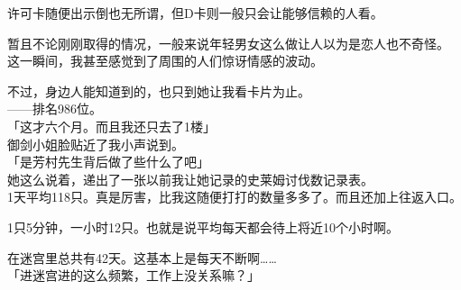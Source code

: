 许可卡随便出示倒也无所谓，但D卡则一般只会让能够信赖的人看。

暂且不论刚刚取得的情况，一般来说年轻男女这么做让人以为是恋人也不奇怪。\\

这一瞬间，我甚至感觉到了周围的人们惊讶情感的波动。

不过，身边人能知道到的，也只到她让我看卡片为止。\\

——排名986位。\\

「这才六个月。而且我还只去了1楼」\\

御剑小姐脸贴近了我小声说到。\\

「是芳村先生背后做了些什么了吧」\\

她这么说着，递出了一张以前我让她记录的史莱姆讨伐数记录表。\\

1天平均118只。真是厉害，比我这随便打打的数量多多了。而且还加上往返入口。

1只5分钟，一小时12只。也就是说平均每天都会待上将近10个小时啊。

在迷宫里总共有42天。这基本上是每天不断啊……\\

「进迷宫进的这么频繁，工作上没关系嘛？」

